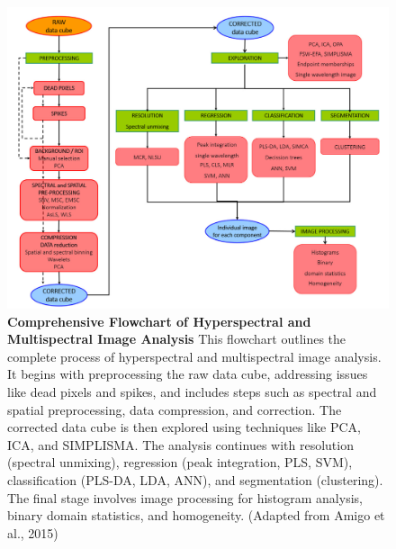 \documentclass[10pt,svgnames,fragile]{beamer}
\begin{document}
\begin{frame}{}
\tiny
\begin{figure}
    \centering
            \centering
            \includegraphics[width=0.62\linewidth]{amigo_chart.png}
            \caption{\textbf{Comprehensive Flowchart of Hyperspectral and Multispectral Image Analysis} This flowchart outlines the complete process of hyperspectral and multispectral image analysis. It begins with preprocessing the raw data cube, addressing issues like dead pixels and spikes, and includes steps such as spectral and spatial preprocessing, data compression, and correction. The corrected data cube is then explored using techniques like PCA, ICA, and SIMPLISMA. The analysis continues with resolution (spectral unmixing), regression (peak integration, PLS, SVM), classification (PLS-DA, LDA, ANN), and segmentation (clustering). The final stage involves image processing for histogram analysis, binary domain statistics, and homogeneity. (Adapted from Amigo et al., 2015)\cite{amigoHyperspectralMultispectralImaging2019}}
    \label{fig:amigo_chart}
\end{figure}

\end{frame}
\end{document}
